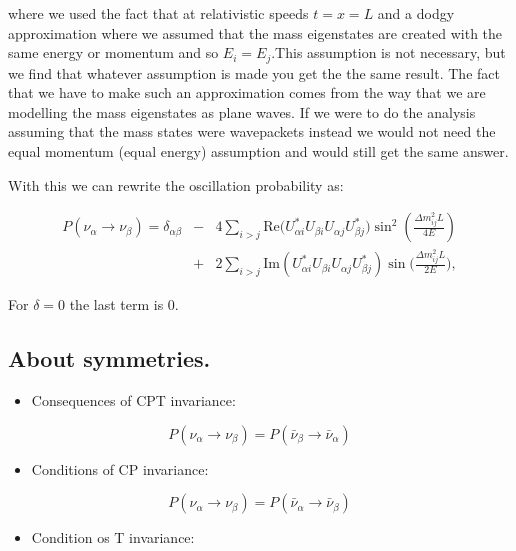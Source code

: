 \documentclass[
  letterpaper,
  DIV=11,
  numbers=noendperiod]{scrreprt}
\providecommand{\tightlist}{%
  \setlength{\itemsep}{0pt}\setlength{\parskip}{0pt}}\usepackage{longtable,booktabs,array}
\begin{document}
where we used the fact that at relativistic speeds \(t = x = L\) and a
dodgy approximation where we assumed that the mass eigenstates are
created with the same energy or momentum and so \(E_i = E_j\).This
assumption is not necessary, but we find that whatever assumption is
made you get the the same result. The fact that we have to make such an
approximation comes from the way that we are modelling the mass
eigenstates as plane waves. If we were to do the analysis assuming that
the mass states were wavepackets instead we would not need the equal
momentum (equal energy) assumption and would still get the same answer.

With this we can rewrite the oscillation probability as:

\[\begin{matrix}P(\nu_\alpha \rightarrow \nu_\beta)=\delta_{\alpha\beta} & - & 4{\displaystyle \sum_{i>j}\mathrm{ Re}(U_{\alpha i}^{*}U_{\beta i}U_{\alpha j}U_{\beta j}^{*}})\sin^{2}(\frac{\Delta m_{ij}^{2}L}{4E})\\ & + & {\displaystyle 2\sum_{i>j}\mathrm{ Im}(U_{\alpha i}^{*}U_{\beta i}U_{\alpha j}U_{\beta j}^{*})\sin(}\frac{\Delta m_{ij}^{2}L}{2E}),\end{matrix}\]

For \(\delta = 0\) the last term is 0.

\subsection*{About symmetries.}\label{about-symmetries.}

\begin{itemize}
\tightlist
\item
  Consequences of CPT invariance:
\end{itemize}

\[P(\nu_\alpha \rightarrow \nu_\beta) = P({\bar \nu_\beta} \rightarrow {\bar \nu_\alpha})\]

\begin{itemize}
\tightlist
\item
  Conditions of CP invariance:
\end{itemize}

\[P(\nu_\alpha \rightarrow \nu_\beta) = P({\bar \nu_\alpha} \rightarrow {\bar \nu_\beta}) \]

\begin{itemize}
\tightlist
\item
  Condition os T invariance:
\end{itemize}
\end{document}
